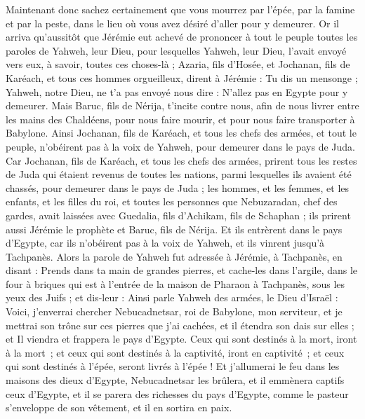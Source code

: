 \begin{multicols}{2}
Maintenant donc sachez certainement que vous mourrez par l'épée, par la famine et par la peste, dans le lieu où vous avez désiré d’aller pour y demeurer.
\VerseOne{}Or il arriva qu'aussitôt que Jérémie eut achevé de prononcer à tout le peuple toutes les paroles de Yahweh, leur Dieu, pour lesquelles Yahweh, leur Dieu, l'avait envoyé vers eux, à savoir, toutes ces choses-là ;
Azaria, fils d'Hosée, et Jochanan, fils de Karéach, et tous ces hommes orgueilleux, dirent à Jérémie : Tu dis un mensonge ; Yahweh, notre Dieu, ne t'a pas envoyé nous dire : N'allez pas en Egypte pour y demeurer.
Mais Baruc, fils de Nérija, t'incite contre nous, afin de nous livrer entre les mains des Chaldéens, pour nous faire mourir, et pour nous faire transporter à Babylone.
Ainsi Jochanan, fils de Karéach, et tous les chefs des armées, et tout le peuple, n'obéirent pas à la voix de Yahweh, pour demeurer dans le pays de Juda.
Car Jochanan, fils de Karéach, et tous les chefs des armées, prirent tous les restes de Juda qui étaient revenus de toutes les nations, parmi lesquelles ils avaient été chassés, pour demeurer dans le pays de Juda ;
les hommes, et les femmes, et les enfants, et les filles du roi, et toutes les personnes que Nebuzaradan, chef des gardes, avait laissées avec Guedalia, fils d'Achikam, fils de Schaphan ; ils prirent aussi Jérémie le prophète et Baruc, fils de Nérija.
Et ils entrèrent dans le pays d'Egypte, car ils n'obéirent pas à la voix de Yahweh, et ils vinrent jusqu'à Tachpanès.
Alors la parole de Yahweh fut adressée à Jérémie, à Tachpanès, en disant :
Prends dans ta main de grandes pierres, et cache-les dans l'argile, dans le four à briques qui est à l'entrée de la maison de Pharaon à Tachpanès, sous les yeux des Juifs ;
et dis-leur : Ainsi parle Yahweh des armées, le Dieu d'Israël : Voici, j'enverrai chercher Nebucadnetsar, roi de Babylone, mon serviteur, et je mettrai son trône sur ces pierres que j'ai cachées, et il étendra son dais sur elles ;
et Il viendra et frappera le pays d'Egypte. Ceux qui sont destinés à la mort, iront à la mort ; et ceux qui sont destinés à la captivité, iront en captivité ; et ceux qui sont destinés à l’épée, seront livrés à l’épée !
Et j'allumerai le feu dans les maisons des dieux d'Egypte, Nebucadnetsar les brûlera, et il emmènera captifs ceux d'Egypte, et il se parera des richesses du pays d'Egypte, comme le pasteur s'enveloppe de son vêtement, et il en sortira en paix.

\end{multicols}
